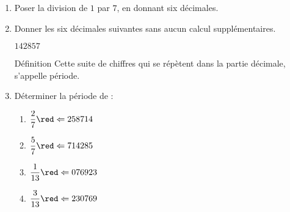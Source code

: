 \begin{corrige}
    \begin{enumerate}
        \item Poser la division de $1$ par $7$, en donnant six décimales.
        
        {\red {}}
        \item Donner les six décimales suivantes sans aucun calcul supplémentaires.
        
        {\red $142857$}
        \begin{myBox}{ Définition}
            Cette suite de chiffres qui se répètent dans la partie décimale, s'appelle période.
        \end{myBox}
        \item Déterminer la période de :
        \begin{multicols}{2}
            \begin{spacing}{1.5}
                \begin{enumerate}
                    \item $\dfrac{2}{7}  {\red \Leftarrow 258714}$
                    \item $\dfrac{5}{7}  {\red \Leftarrow 714285}$
                    \item $\dfrac{1}{13} {\red \Leftarrow 076923}$
                    \item $\dfrac{3}{13} {\red \Leftarrow 230769}$
                \end{enumerate}
            \end{spacing}
        \end{multicols}
    \end{enumerate}
\end{corrige}

